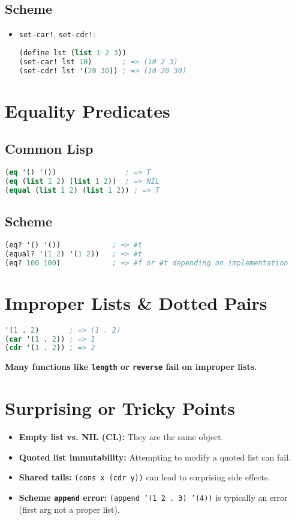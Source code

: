 \documentclass[10pt]{article}
\begin{document}
\subsection*{Scheme}
\begin{itemize}
  \item \texttt{set-car!}, \texttt{set-cdr!}:
\begin{lstlisting}[language=Lisp]
(define lst (list 1 2 3))
(set-car! lst 10)       ; => (10 2 3)
(set-cdr! lst '(20 30)) ; => (10 20 30)
\end{lstlisting}
\end{itemize}

\section{Equality Predicates}
\subsection*{Common Lisp}
\begin{lstlisting}[language=Lisp]
(eq '() '())                ; => T
(eq (list 1 2) (list 1 2))  ; => NIL
(equal (list 1 2) (list 1 2)) ; => T
\end{lstlisting}

\subsection*{Scheme}
\begin{lstlisting}[language=Lisp]
(eq? '() '())            ; => #t
(equal? '(1 2) '(1 2))   ; => #t
(eq? 100 100)            ; => #f or #t depending on implementation
\end{lstlisting}

\section{Improper Lists \& Dotted Pairs}
\begin{lstlisting}[language=Lisp]
'(1 . 2)       ; => (1 . 2)
(car '(1 . 2)) ; => 1
(cdr '(1 . 2)) ; => 2
\end{lstlisting}
\textbf{Many functions like \texttt{length} or \texttt{reverse} fail on improper lists.}

\section{Surprising or Tricky Points}
\begin{itemize}
  \item \textbf{Empty list vs. NIL (CL):} They are the same object.
  \item \textbf{Quoted list immutability:} Attempting to modify a quoted list can fail.
  \item \textbf{Shared tails:} \texttt{(cons x (cdr y))} can lead to surprising side effects.
  \item \textbf{Scheme \texttt{append} error:} \texttt{(append '(1 2 . 3) '(4))} is typically an error (first arg not a proper list).
\end{itemize}
\end{document}
